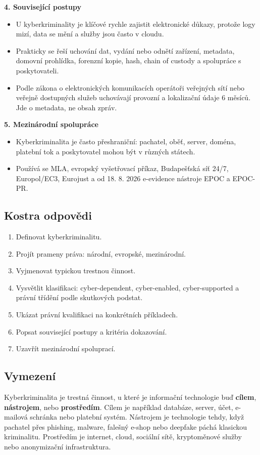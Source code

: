\textbf{4. Související postupy}
\begin{itemize}
  \item U kyberkriminality je klíčové rychle zajistit elektronické důkazy, protože logy mizí, data se mění a služby jsou často v cloudu.
  \item Prakticky se řeší uchování dat, vydání nebo odnětí zařízení, metadata, domovní prohlídka, forenzní kopie, hash, chain of custody a spolupráce s poskytovateli.
  \item Podle zákona o elektronických komunikacích operátoři veřejných sítí nebo veřejně dostupných služeb uchovávají provozní a lokalizační údaje 6 měsíců. Jde o metadata, ne obsah zpráv.
\end{itemize}

\textbf{5. Mezinárodní spolupráce}
\begin{itemize}
  \item Kyberkriminalita je často přeshraniční: pachatel, oběť, server, doména, platební tok a poskytovatel mohou být v různých státech.
  \item Používá se MLA, evropský vyšetřovací příkaz, Budapešťská síť 24/7, Europol/EC3, Eurojust a od 18. 8. 2026 e-evidence nástroje EPOC a EPOC-PR.
\end{itemize}

\subsection*{Kostra odpovědi}
\begin{enumerate}
  \item Definovat kyberkriminalitu.
  \item Projít prameny práva: národní, evropské, mezinárodní.
  \item Vyjmenovat typickou trestnou činnost.
  \item Vysvětlit klasifikaci: cyber-dependent, cyber-enabled, cyber-supported a právní třídění podle skutkových podstat.
  \item Ukázat právní kvalifikaci na konkrétních příkladech.
  \item Popsat související postupy a kritéria dokazování.
  \item Uzavřít mezinárodní spoluprací.
\end{enumerate}

\subsection*{Vymezení}
Kyberkriminalita je trestná činnost, u které je informační technologie buď \textbf{cílem}, \textbf{nástrojem}, nebo \textbf{prostředím}. Cílem je například databáze, server, účet, e-mailová schránka nebo platební systém. Nástrojem je technologie tehdy, když pachatel přes phishing, malware, falešný e-shop nebo deepfake páchá klasickou kriminalitu. Prostředím je internet, cloud, sociální sítě, kryptoměnové služby nebo anonymizační infrastruktura.

